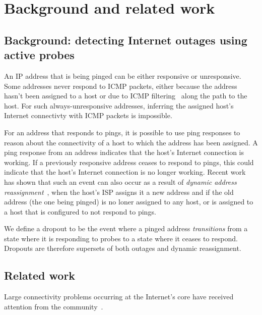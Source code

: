 \section{Background and related work}
\label{sec:bg}

\subsection{Background: detecting Internet outages using active probes}

An IP address that is being pinged can be either responsive or
unresponsive. Some addresses never respond to ICMP packets, either
because the address hasn't been assigned to a host or due to ICMP
filtering~\cite{v4-census-imc16} along the path to the host. For such always-unresponsive
addresses, inferring the assigned host's Internet connectivty with ICMP packets is impossible.

For an address that responds to pings, it is possible to use ping
responses to reason about the connectivity of a host to which the address has been
assigned. A ping response from an address indicates that the
host's Internet connection is working. If a previously
responsive address ceases to respond to pings, this could indicate
that the host's Internet connection is no longer working. Recent work
has shown that such an event can also occur as a result of \emph{dynamic
address reassignment}~\cite{addrchange-imc}, when the host's ISP
assigns it a new address and if the old address (the one being pinged)
is no loner assigned to any host, or is assigned to a host that is
configured to not respond to pings.

We define a dropout to be the event where a pinged address \emph{transitions}
from a state where it is responding to probes to a state where it
ceases to respond. Dropouts are therefore supersets of both outages
and dynamic reassignment.

\subsection{Related work}

Large connectivity problems occurring at the Internet's core have
received attention from the community~\cite{censorship-outages, trinocular, hubble, paxson-e2e,
  hubble, netdiagnoser, lifeguard,
  poiroot, phillipa-outages-mailing-list,
  california-fault-lines, delayed-routing-convergence, consensus-routing,
  routing-e2e-path-perf, voip-bgp-convergence}. 

